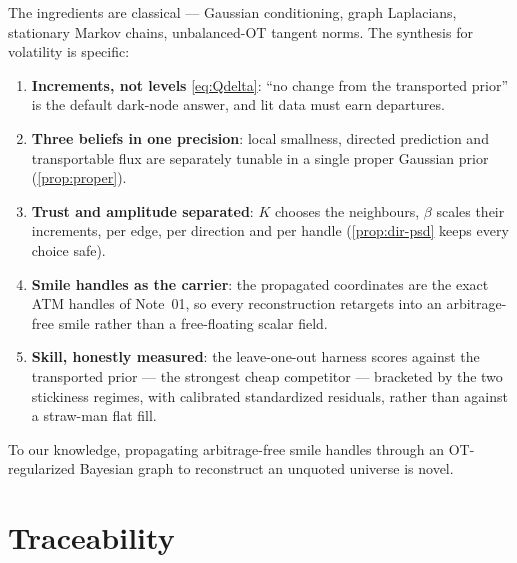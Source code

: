 \documentclass[11pt]{article}
\begin{document}
The ingredients are classical --- Gaussian conditioning, graph Laplacians,
stationary Markov chains, unbalanced-OT tangent norms. The synthesis for
volatility is specific:
\begin{enumerate}[leftmargin=1.6em]
\item \textbf{Increments, not levels} \eqref{eq:Qdelta}: ``no change from the
transported prior'' is the default dark-node answer, and lit data must earn
departures.
\item \textbf{Three beliefs in one precision}: local smallness, directed
prediction and transportable flux are separately tunable in a single proper
Gaussian prior (\cref{prop:proper}).
\item \textbf{Trust and amplitude separated}: $K$ chooses the neighbours,
$\beta$ scales their increments, per edge, per direction and per handle
(\cref{prop:dir-psd} keeps every choice safe).
\item \textbf{Smile handles as the carrier}: the propagated coordinates are the
exact ATM handles of Note~01, so every reconstruction retargets into an
arbitrage-free smile rather than a free-floating scalar field.
\item \textbf{Skill, honestly measured}: the leave-one-out harness scores
against the transported prior --- the strongest cheap competitor --- bracketed
by the two stickiness regimes, with calibrated standardized residuals, rather
than against a straw-man flat fill.
\end{enumerate}
To our knowledge, propagating arbitrage-free smile handles through an
OT-regularized Bayesian graph to reconstruct an unquoted universe is novel.

\section{Traceability}
\label{sec:traceability}
\end{document}
